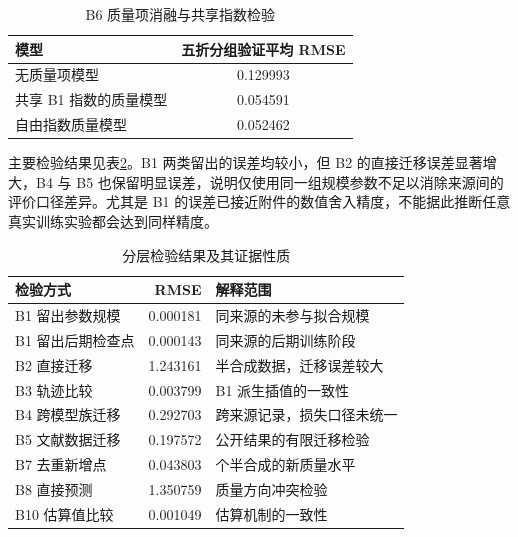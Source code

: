 \documentclass[bwprint]{gmcmthesis}
\begin{document}
        \begin{table}[H]
         \centering
         \caption{B6 质量项消融与共享指数检验}
         \label{tab:p2_quality_ablation}
         \begin{tabular}{lc}
          \toprule
          模型 & 五折分组验证平均 RMSE \\
          \midrule
          无质量项模型 & 0.129993 \\
          共享 B1 指数的质量模型 & 0.054591 \\
          自由指数质量模型 & 0.052462 \\
          \bottomrule
         \end{tabular}
        \end{table}
        
        主要检验结果见表\ref{tab:p2_validation}。B1 两类留出的误差均较小，但 B2 的直接迁移误差显著增大，B4 与 B5 也保留明显误差，说明仅使用同一组规模参数不足以消除来源间的评价口径差异。尤其是 B1 的误差已接近附件的数值舍入精度，不能据此推断任意真实训练实验都会达到同样精度。
        
        \begin{table}[H]
         \centering
         \caption{分层检验结果及其证据性质}
         \label{tab:p2_validation}
         \begin{tabularx}{\linewidth}{@{}l r >{\raggedright\arraybackslash}X@{}}
          \toprule
          检验方式 & RMSE & 解释范围 \\
          \midrule
          B1 留出参数规模 & 0.000181 & 同来源的未参与拟合规模 \\
          B1 留出后期检查点 & 0.000143 & 同来源的后期训练阶段 \\
          B2 直接迁移 & 1.243161 & 半合成数据，迁移误差较大 \\
          B3 轨迹比较 & 0.003799 & B1 派生插值的一致性 \\
          B4 跨模型族迁移 & 0.292703 & 跨来源记录，损失口径未统一 \\
          B5 文献数据迁移 & 0.197572 & 公开结果的有限迁移检验 \\
          B7 去重新增点 & 0.043803 & 90 个半合成的新质量水平 \\
          B8 直接预测 & 1.350759 & 质量方向冲突检验 \\
          B10 估算值比较 & 0.001049 & 估算机制的一致性 \\
          \bottomrule
         \end{tabularx}
        \end{table}
        
\end{document}
